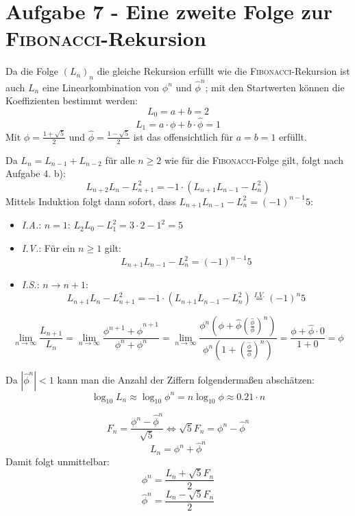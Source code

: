 \section*{Aufgabe 7 - Eine zweite Folge zur \textsc{Fibonacci}-Rekursion}

\begin{flushalphb}
\item
	Da die Folge $(L_n)_n$ die gleiche Rekursion erfüllt wie die \textsc{Fibonacci}-Rekursion
	ist auch $L_n$ eine Linearkombination von $\phi^n$ und $\hat\phi^n$; mit den Startwerten
	können die Koeffizienten bestimmt werden:
	\[ L_0 = a + b = 2 \]
	\[ L_1 = a \cdot \phi + b\cdot \hat\phi = 1 \]
	Mit $\phi = \frac{1 + \sqrt{5}}{2}$ und $\hat\phi = \frac{1 - \sqrt{5}}{2}$ ist das offensichtlich für $a = b = 1$ erfüllt.

\item 
	Da $L_n = L_{n-1} + L_{n-2}$ für alle $n \geq 2$ wie für die \textsc{Fibonacci}-Folge gilt, folgt nach Aufgabe 4. b):
	\[ L_{n+2}L_n  - L_{n+1}^2 = -1 \cdot (L_{n+1}L_{n-1} - L_n^2) \]
	Mittels Induktion folgt dann sofort, dass $L_{n+1}L_{n-1} - L_n^2 = (-1)^{n-1}5$:
	\begin{itemize}
		\item \textit{I.A.}: $n = 1$: $L_2L_0 - L_1^2 = 3 \cdot 2 - 1^2 = 5$
		\item \textit{I.V.}: Für ein $n \geq 1$ gilt:
			\[ L_{n+1}L_{n-1} - L_n^2 = (-1)^{n-1} 5 \]
		\item \textit{I.S.}: $n \rightarrow n+1$:
			\[ L_{n+1}L_n - L_{n+1}^2 = -1 \cdot (L_{n+1}L_{n-1} - L_n^2) \overset{I.V.}{=} (-1)^n 5 \]
	\end{itemize}

\item
	\[ \lim_{n \rightarrow \infty} \frac{L_{n+1}}{L_n} =
	   \lim_{n \rightarrow \infty} \frac{\phi^{n+1} + \hat\phi^{n+1}}{\phi^n + \phi^n} =
	   \lim_{n \rightarrow \infty} \frac{\phi^n \left(\phi + \hat\phi \left( \frac{\hat\phi}{\phi}\right)^n \right)}
	   				    {\phi^n \left( 1 + \left(\frac{\hat\phi}{\phi}\right)^n \right)} =
	   \frac{\phi + \hat\phi \cdot 0}{1 + 0} = \phi \]

\item Da $|\hat\phi^n| < 1$ kann man die Anzahl der Ziffern folgendermaßen abschätzen:
	\[ \log_ {10} L_n \approx \log_{10} \phi^n = n \log_{10} \phi \approx 0.21 \cdot n \]

\item
	\[ F_n = \frac{\phi^n - \hat\phi^n}{\sqrt{5}} \Leftrightarrow \sqrt{5} F_n = \phi^n - \hat\phi^n \]
	\[ L_n = \phi^n + \hat\phi^n \]
	Damit folgt unmittelbar:
	\[ \phi^n = \frac{L_n + \sqrt{5} F_n}{2} \]
	\[ \hat\phi^n = \frac{L_n - \sqrt{5} F_n}{2} \]
\end{flushalphb}
